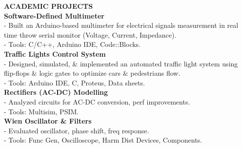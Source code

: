 \documentclass{article}
\begin{document}
\begin{minipage}[t]{0.66\textwidth}
\vspace{1.5em}
{\color{sectionteal}\large\bfseries ACADEMIC PROJECTS} \\[0.05em]
\textbf{Software-Defined Multimeter} \\
- Built an Arduino-based multimeter for electrical signals measurement in real time throw serial monitor (Voltage, Current, Impedance). \\
- Tools: C/C++, Arduino IDE, Code::Blocks. \\[0.3em]
\textbf{Traffic Lights Control System} \\
- Designed, simulated, \& implemented an automated traffic light system using flip-flops \& logic gates to optimize cars \& pedestrians flow. \\[0.3em]
- Tools: Arduino IDE, C, Proteus, Data sheets. \\[0.5em]
\textbf{Rectifiers (AC-DC) Modelling} \\
- Analyzed circuits for AC-DC conversion, perf improvements. \\[0.3em]
- Tools: Multisim, PSIM. \\[0.5em]
\textbf{Wien Oscillator \& Filters} \\
- Evaluated oscillator, phase shift, freq response. \\[0.3em]
- Tools: Func Gen, Oscilloscope, Harm Dist Devices, Components.
\end{minipage}
\end{document}
